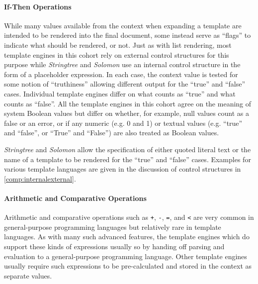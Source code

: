 \paragraph{If-Then Operations}
While many values available from the context when expanding a template are intended to be rendered into the final document, some instead serve as \enquote{flags} to indicate what should be rendered, or not. Just as with list rendering, most \gls{template engine}s in this cohort rely on external control structures for this purpose while \emph{Stringtree} and \emph{Solomon} use an internal control structure in the form of a placeholder expression. In each case, the context value is tested for some notion of \enquote{truthiness} allowing different output for the \enquote{true} and \enquote{false} cases. Individual \gls{template engine}s differ on what counts as \enquote{true} and what counts as \enquote{false}. All the \gls{template engine}s in this cohort agree on the meaning of system Boolean values but differ on whether, for example, null values count as a false or an error, or if any numeric (e.g. 0 and 1) or textual values (e.g. \enquote{true} and \enquote{false}, or \enquote{True} and \enquote{False}) are also treated as Boolean values.

\emph{Stringtree} and \emph{Solomon} allow the specification of either quoted literal text or the name of a template to be rendered for the \enquote{true} and \enquote{false} cases. Examples for various \gls{template language}s are given in the discussion of control structures in \autoref{comp:internalexternal}.

\paragraph{Arithmetic and Comparative Operations}
Arithmetic and comparative operations such as \verb!+!, \verb!-!, \verb!=!, and \verb!<! are very common in general-purpose \gls{programming language}s but relatively rare in \gls{template language}s. As with many such advanced features, the \gls{template engine}s which do support these kinds of expressions usually so by handing off parsing and evaluation to a general-purpose \gls{programming language}. Other \gls{template engine}s usually require such expressions to be pre-calculated and stored in the context as separate values.

